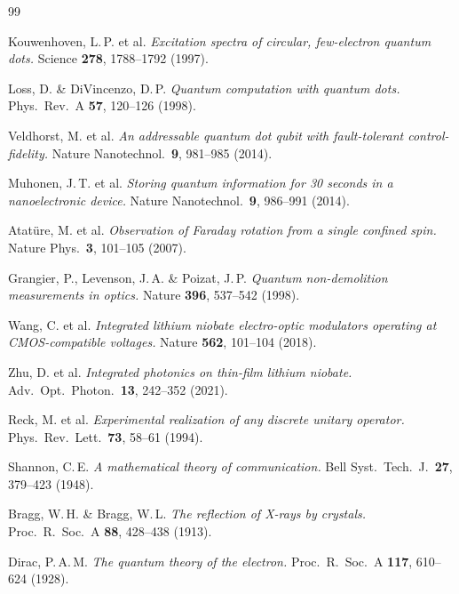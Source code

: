 \begin{thebibliography}{99}

Kouwenhoven, L.\,P. et al.
\textit{Excitation spectra of circular, few-electron quantum dots.}
Science \textbf{278}, 1788--1792 (1997).

Loss, D. \& DiVincenzo, D.\,P.
\textit{Quantum computation with quantum dots.}
Phys.\ Rev.\ A \textbf{57}, 120--126 (1998).

Veldhorst, M. et al.
\textit{An addressable quantum dot qubit with fault-tolerant control-fidelity.}
Nature Nanotechnol.\ \textbf{9}, 981--985 (2014).

Muhonen, J.\,T. et al.
\textit{Storing quantum information for 30 seconds in a nanoelectronic device.}
Nature Nanotechnol.\ \textbf{9}, 986--991 (2014).

Atatüre, M. et al.
\textit{Observation of Faraday rotation from a single confined spin.}
Nature Phys.\ \textbf{3}, 101--105 (2007).

Grangier, P., Levenson, J.\,A. \& Poizat, J.\,P.
\textit{Quantum non-demolition measurements in optics.}
Nature \textbf{396}, 537--542 (1998).

Wang, C. et al.
\textit{Integrated lithium niobate electro-optic modulators operating at
CMOS-compatible voltages.}
Nature \textbf{562}, 101--104 (2018).

Zhu, D. et al.
\textit{Integrated photonics on thin-film lithium niobate.}
Adv.\ Opt.\ Photon.\ \textbf{13}, 242--352 (2021).

Reck, M. et al.
\textit{Experimental realization of any discrete unitary operator.}
Phys.\ Rev.\ Lett.\ \textbf{73}, 58--61 (1994).

Shannon, C.\,E.
\textit{A mathematical theory of communication.}
Bell Syst.\ Tech.\ J.\ \textbf{27}, 379--423 (1948).

Bragg, W.\,H. \& Bragg, W.\,L.
\textit{The reflection of X-rays by crystals.}
Proc.\ R.\ Soc.\ A \textbf{88}, 428--438 (1913).

Dirac, P.\,A.\,M.
\textit{The quantum theory of the electron.}
Proc.\ R.\ Soc.\ A \textbf{117}, 610--624 (1928).


\end{thebibliography}
